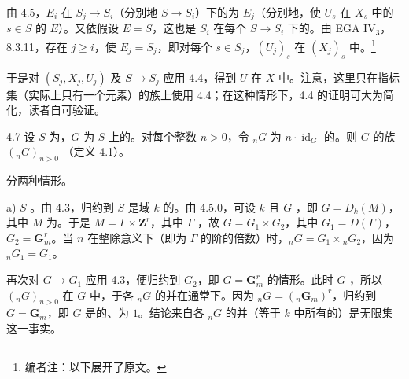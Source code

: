 由 4.5，$E_i$ 在 $S_j\to S_i$（分别地 $S\to S_i$）下的为 $E_j$（分别地，使 $U_s$ 在 $X_s$ 中的 $s\in S$ 的 $E$）。又依假设 $E=S$，这也是 $S_i$ 在每个 $S\to S_i$ 下的。由 EGA IV$_3$，8.3.11，存在 $j\geq i$，使 $E_j=S_j$，即对每个 $s\in S_j$，$(U_j)_s$ 在 $(X_j)_s$ 中。\footnote{编者注：以下展开了原文。}

于是对 $(S_j,X_j,U_j)$ 及 $S\to S_j$ 应用 4.4，得到 $U$ 在 $X$ 中。注意，这里只在指标集（实际上只有一个元素）的族上使用 4.4；在这种情形下，4.4 的证明可大为简化，读者自可验证。
\begin{SGAresult}{}{4.7}
设 $S$ 为，$G$ 为 $S$ 上的。对每个整数 $n>0$，令 ${}_nG$ 为 $n\cdot\operatorname{id}_G$ 的。则 $G$ 的族 $({}_nG)_{n>0}$ （定义 4.1）。
\end{SGAresult}
分两种情形。

a) $S$ 。由 4.3，归约到 $S$ 是域 $k$ 的。由 4.5.0，可设 $k$ 且 $G$ ，即 $G=D_k(M)$，其中 $M$ 为。于是 $M=\Gamma\times\mathbf Z^r$，其中 $\Gamma$ ，故 $G=G_1\times G_2$，其中 $G_1=D(\Gamma)$，$G_2=\mathbf G_m^r$。当 $n$ 在整除意义下（即为 $\Gamma$ 的阶的倍数）时，${}_nG=G_1\times{}_nG_2$，因为 ${}_nG_1=G_1$。

再次对 $G\to G_1$ 应用 4.3，便归约到 $G_2$，即 $G=\mathbf G_m^r$ 的情形。此时 $G$ ，所以 $({}_nG)_{n>0}$ 在 $G$ 中，于各 ${}_nG$ 的并在通常下。因为 ${}_nG=({}_n\mathbf G_m)^r$，归约到 $G=\mathbf G_m$，即 $G$ 是的、为 $1$。结论来自各 ${}_nG$ 的并（等于 $k$ 中所有的）是无限集这一事实。

